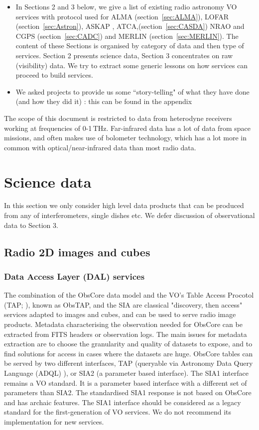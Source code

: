 \documentclass[11pt,a4paper]{ivoa}
\begin{document}
\begin{itemize}
\item  In Sections 2 and 3 below, we give a list of existing radio astronomy VO services with protocol used for ALMA (section~\ref{sec:ALMA}), LOFAR (section~\ref{sec:Astron}), ASKAP  , ATCA,(section~\ref{sec:CASDA}) NRAO and CGPS (section~\ref{sec:CADC}) and MERLIN (section~\ref{sec:MERLIN}).
The content of these Sections is organised  by category of data and then type of services. Section 2 presents science data, Section 3 concentrates on raw (visibility) data. We try to extract some generic lessons on how services can proceed to build services.
\item We asked projects to provide us some ``story-telling" of what they have done (and how they did it) : this can be found in the appendix
\end{itemize}

The scope of this document is restricted to data from heterodyne receivers working at frequencies of 0-1\,THz. Far-infrared data has a lot of data from space missions, and often makes use of bolometer technology, which has a lot more in common with optical/near-infrared data than most radio data.

\section{Science data}

In this section we only consider high level data products that can be produced from any of interferometers, single dishes etc. We defer discussion of observational data to Section 3.   



\subsection{Radio 2D images and cubes}
\subsubsection{Data Access Layer (DAL) services}
The combination of the ObsCore data model and the VO's Table Access Procotol (TAP; \cite{std:TAP}), known as ObsTAP, and the SIA are classical "discovery, then access" services adapted to images and cubes, and can be used to serve radio image products. Metadata characterising the observation needed for ObsCore can be extracted from FITS headers or observation logs. The main issues for metadata extraction are to choose the granularity and quality of datasets to expose, and to find solutions for access in cases where the datasets are huge. ObsCore tables can be served by two different interfaces, TAP  (queryable via Astronomy Data Query Language (ADQL) \citep{2008ivoa.spec.1030O} ), or SIA2 (a parameter based interface). The SIA1 interface remains a VO standard. It is a parameter based interface with a different set of parameters than SIA2. The standardised SIA1 response is not based on ObsCore and has archaic features. The SIA1 interface should be considered as a legacy standard for the first-generation of VO services. We do not recommend its implementation for new services. 
\end{document}
